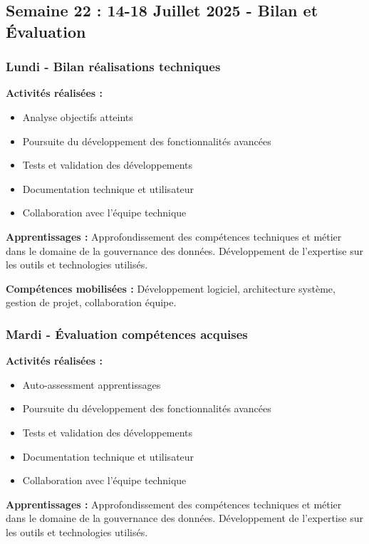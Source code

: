 \subsection{Semaine 22 : 14-18 Juillet 2025 - Bilan et Évaluation}

\subsubsection{Lundi - Bilan réalisations techniques}

\textbf{Activités réalisées :}
\begin{itemize}
    \item Analyse objectifs atteints
    \item Poursuite du développement des fonctionnalités avancées
    \item Tests et validation des développements
    \item Documentation technique et utilisateur
    \item Collaboration avec l'équipe technique
\end{itemize}

\textbf{Apprentissages :}
Approfondissement des compétences techniques et métier dans le domaine de la gouvernance des données. Développement de l'expertise sur les outils et technologies utilisés.

\textbf{Compétences mobilisées :}
Développement logiciel, architecture système, gestion de projet, collaboration équipe.

\subsubsection{Mardi - Évaluation compétences acquises}

\textbf{Activités réalisées :}
\begin{itemize}
    \item Auto-assessment apprentissages
    \item Poursuite du développement des fonctionnalités avancées
    \item Tests et validation des développements
    \item Documentation technique et utilisateur
    \item Collaboration avec l'équipe technique
\end{itemize}

\textbf{Apprentissages :}
Approfondissement des compétences techniques et métier dans le domaine de la gouvernance des données. Développement de l'expertise sur les outils et technologies utilisés.

